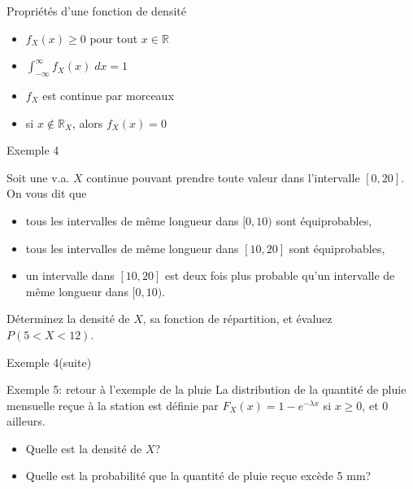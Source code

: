 \documentclass[handout]{BeamerTemplate}
\begin{document}
\begin{frame}[t]{Propriétés d'une fonction de densité}

\begin{itemize}
 \item[1.] $f_X(x)\ge0$ pour tout $x\in\mathbb{R}$
 \item[2.] $\displaystyle\int_{-\infty}^\infty f_X(x)\;dx=1$
 \item[3.] $f_X$ est continue par morceaux
 \item[4.] si $x\notin \mathbb{R}_X$, alors $f_X(x)=0$ %
\end{itemize}


\end{frame}


\begin{frame}[t]{Exemple 4}

{\small
Soit une v.a. $X$ continue pouvant prendre toute valeur dans l'intervalle
$[0,20]$. On vous dit que
\begin{itemize}
\item tous les intervalles de même longueur dans $[0,10)$ sont équiprobables,
\item tous les intervalles de même longueur dans $[10,20]$ sont équiprobables,
\item un intervalle dans $[10,20]$ est deux fois plus probable qu'un intervalle de même longueur dans $[0,10)$.
    \end{itemize}
Déterminez la densité de $X$, sa fonction de répartition, et évaluez $P(5<X<12)$.}
\end{frame}

\begin{frame}[t]{Exemple 4(suite)}
\end{frame}

\begin{frame}[t]{Exemple 5: retour à l'exemple de la pluie}
La distribution de la quantité de pluie mensuelle re\c{c}ue à la station
est définie par $F_X(x)=1-e^{-\lambda x}$ si
$x\ge0$, et $0$ ailleurs.
\begin{itemize}\itemsep 2cm
\item Quelle est la densité de $X$?
\item Quelle est la probabilité que la quantité de pluie re\c{c}ue excède 5 mm?
\end{itemize}
\end{frame}
\end{document}
